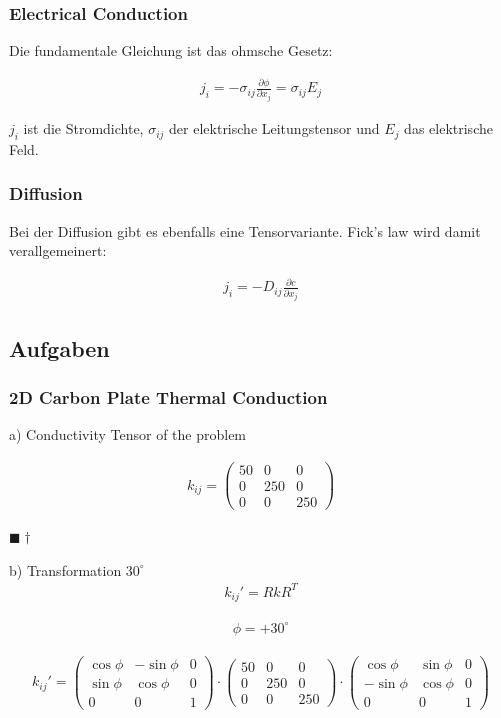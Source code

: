\documentclass[a4paper]{scrartcl}
\newcommand{\qed}{\begin{flushright}
$\blacksquare \dagger$ \end{flushright}}
\begin{document}
\subsubsection{Electrical Conduction}
Die fundamentale Gleichung ist das ohmsche Gesetz:

\begin{align}
j_i=-\sigma_{ij}\frac{\partial \phi}{\partial x_j}=\sigma_{ij}E_j
\end{align}

$j_i$ ist die Stromdichte, $\sigma_{ij}$ der elektrische Leitungstensor und
$E_j$ das elektrische Feld.

\subsubsection{Diffusion}
Bei der Diffusion gibt es ebenfalls eine Tensorvariante. Fick's law wird damit
verallgemeinert:

\begin{align}
j_i=-D_{ij}\frac{\partial c}{\partial x_j}
\end{align}

\subsection{Aufgaben}
\subsubsection{2D Carbon Plate Thermal Conduction}

a) Conductivity Tensor of the problem

\begin{align}
k_{ij}=\begin{pmatrix}
50 & 0 & 0 \\
0 & 250 & 0 \\
0 & 0 & 250 
\end{pmatrix}
\end{align}
\qed

b) Transformation $30^\circ$
\begin{align}
k_{ij}'=RkR^{T}
\end{align}

\begin{align}
\phi=+30^\circ
\end{align}

\begin{align}
k_{ij}'=\begin{pmatrix}
\cos{\phi} & -\sin{\phi} & 0 \\
\sin{\phi} & \cos{\phi} & 0 \\
0 & 0 & 1
\end{pmatrix}
\cdot
\begin{pmatrix}
50 & 0 & 0 \\
0 & 250 & 0 \\
0 & 0 & 250 
\end{pmatrix}
\cdot
\begin{pmatrix}
\cos{\phi} & \sin{\phi} & 0 \\
-\sin{\phi} & \cos{\phi} & 0 \\
0 & 0 & 1
\end{pmatrix}
\end{align}
\end{document}
